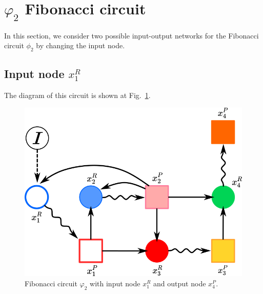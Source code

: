 \section{$\varphi_2$ Fibonacci circuit}
\label{sec:fibonacci}

In this section, we consider two possible input-output networks for the 
Fibonacci circuit $\phi_2$ by changing the input node.

\subsection{Input node $x_1^R$}
\label{ssec:fibo_x1}

The diagram of this circuit is shown at Fig.~\ref{fig:x1input_fibo}.

\begin{figure}[H]
    \centering
    \includegraphics[scale=0.6]{figs/broken_fibo_2.png}
    \caption{Fibonacci circuit $\varphi_2$ with input node $x_1^R$ and output node $x_4^P$.}
    \label{fig:x1input_fibo}    
\end{figure}

